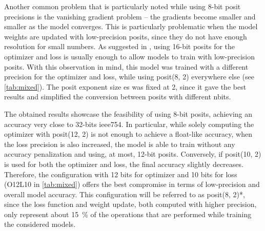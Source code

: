 \documentclass{article}
\begin{document}
	Another common problem that is particularly noted while using 8-bit posit precisions is the vanishing gradient problem -- the gradients become smaller and smaller as the model converges. This is particularly problematic when the model weights are updated with low-precision posits, since they do not have enough resolution for small numbers. As suggested in \cite{Lu2020}, using 16-bit posits for the optimizer and loss is usually enough to allow models to train with low-precision posits. With this observation in mind, this model was trained with a different precision for the optimizer and loss, while using posit(8, 2) everywhere else (see \cref{tab:mixed}). The posit exponent size \gls{es} was fixed at 2, since it gave the best results and simplified the conversion between posits with different \gls{nbits}.
	\begin{table}[t]
		\vspace*{-0.5\baselineskip}
		\centering
		\caption{Accuracy of LeNet-5 trained on Fashion MNIST using posit, quire, and mixed precision. Configuration OxLy means Optimizer (O) with posit(x, 2) and Loss (L) with posit(y, 2), and everything else with posit(8, 2).} %
		\label{tab:mixed}
	\end{table}
	
	The obtained results showcase the feasibility of using 8-bit posits, achieving an accuracy very close to 32-bits \acrshort{ieee754}. In particular, while solely computing the optimizer with posit(12, 2) is not enough to achieve a float-like accuracy, when the loss precision is also increased, the model is able to train without any accuracy penalization and using, at most, 12-bit posits. Conversely, if posit(10, 2) is used for both the optimizer and loss, the final accuracy slightly decreases. Therefore, the configuration with 12 bits for optimizer and 10 bits for loss (O12L10 in \cref{tab:mixed}) offers the best compromise in terms of low-precision and overall model accuracy. This configuration will be referred to as posit(8, 2)*, since the loss function and weight update, both computed with higher precision, only represent about \SI{15}{\percent} of the operations that are performed while training the considered models. 
	
\end{document}
